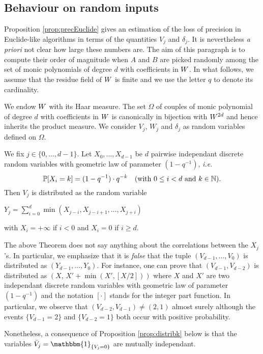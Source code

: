 \documentclass{article}
\begin{document}
\subsection{Behaviour on random inputs}

Proposition \ref{prop:precEuclide} gives an estimation of the loss
of precision in Euclide-like algorithms in terms of the quantities
$V_j$ and $\delta_j$. It is nevertheless \emph{a priori} not clear
how large these numbers are. The aim of this paragraph is to compute
their order of magnitude when $A$ and $B$ are picked randomly among
the set of monic polynomials of degree $d$ with coefficients in $W$.
In what follows, we assume that the residue field of $W$ is finite
and we use the letter $q$ to denote its cardinality.

We endow $W$ with its Haar measure. The set $\Omega$ of couples of 
monic polynomial of degree $d$ with coefficients in $W$ is canonically 
in bijection with $W^{2d}$ and hence inherits the product measure. 
We consider $V_j$, $W_j$ and $\delta_j$ as random variables defined on 
$\Omega$.

\begin{theo}
\label{th:lawVj}
We fix $j \in \{0, \ldots, d-1\}$.
Let $X_0, \ldots, X_{d-1}$ be $d$ pairwise independant discrete random 
variables with geometric law of parameter $(1 - q^{-1})$, \emph{i.e.}
$$\mathbb P[X_i = k] = (1 - q^{-1}) \cdot q^{-k} \quad 
\text{(with } 0 \leq i < d \text{ and } k \in \mathbb N \text{)}.$$
Then $V_j$ is distributed as the random variable
\begin{center}
$\displaystyle Y_j = \sum_{i=0}^d \min(X_{j-i}, X_{j-i+1}, \ldots, X_{j+i})$
\end{center}
\noindent
with $X_i = +\infty$ if $i < 0$ and $X_i = 0$ if $i \geq d$.
\end{theo}

\begin{rem}
The above Theorem does not say anything about the correlations between
the $X_j$'s. In particular, we emphasize that it is \emph{false} that
the tuple $(V_{d-1}, \ldots, V_0)$ is distributed as $(Y_{d-1}, \ldots,
Y_0)$. For instance, one can prove that $(V_{d-1}, 
V_{d-2})$ is distributed as 
$(X, \, X' + \min(X', [X/2]))$
where $X$ and $X'$ are two independant discrete random variables with 
geometric law of parameter $(1 - q^{-1})$ and the notation $[\cdot]$ 
stands for the integer part function. In particular, we observe that 
$(V_{d-2}, V_{d-1}) \neq (2,1)$ almost surely although the events 
$\{V_{d-1} = 2\}$ and $\{V_{d-2} = 1\}$ both occur with positive 
probability.

Nonetheless, a consequence of Proposition \ref{prop:distribk} below is 
that the variables $\bar V_j = \mathbbm{1}_{\{V_j = 0\}}$ are mutually 
independant.
\end{rem}
\end{document}
